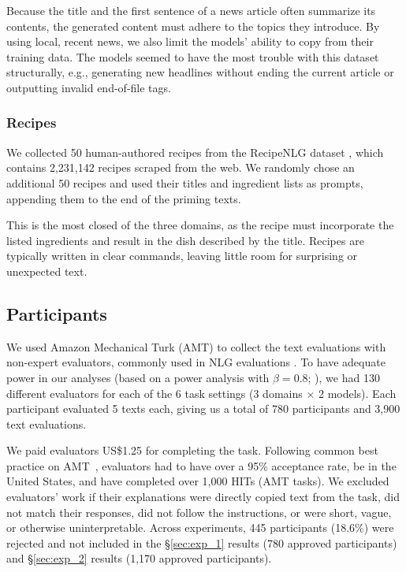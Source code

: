 Because the title and the first sentence of a news article often summarize its contents, the generated content must adhere to the topics they introduce. By using local, recent news, we also limit the models' ability to copy from their training data.
The models seemed to have the most trouble with this dataset structurally, e.g., generating new headlines without ending the current article or outputting invalid end-of-file tags.

\subsubsection{Recipes}
We collected 50 human-authored recipes from the RecipeNLG dataset \citep{bien-etal-2020-recipenlg}, which contains 2,231,142 recipes scraped from the web. We randomly chose an additional 50 recipes and used their titles and ingredient lists as prompts, appending them to the end of the priming texts.

This is the most closed of the three domains, as the recipe must incorporate the listed ingredients and result in the dish described by the title. Recipes are typically written in clear commands, leaving little room for surprising or unexpected text.


\subsection{Participants}\label{sec:participants}
We used Amazon Mechanical Turk (AMT) to collect the text evaluations with non-expert evaluators, commonly used in NLG evaluations \citep{van-der-lee-etal-2019-best}.
To have adequate power in our analyses (based on a power analysis with $\beta=0.8$; \citealp{card-etal-2020-little}), we had 130 different evaluators for each of the 6 task settings (3 domains $\times$ 2 models).
Each participant evaluated 5 texts each, giving us a total of 780 participants and 3,900 text evaluations.

We paid evaluators US\$1.25 for completing the task.
Following common best practice on AMT~\cite{berinsky2012evaluating}, evaluators had to have over a 95\% acceptance rate, be in the United States, and have completed over 1,000 HITs (AMT tasks).
We excluded evaluators' work if their explanations were directly copied text from the task, 
did not match their responses, did not follow the instructions, or were short, vague, or otherwise uninterpretable.
Across experiments, 445 participants (18.6\%) were rejected and not included in the \S\ref{sec:exp_1} results (780 approved participants) and \S\ref{sec:exp_2} results (1,170 approved participants).

